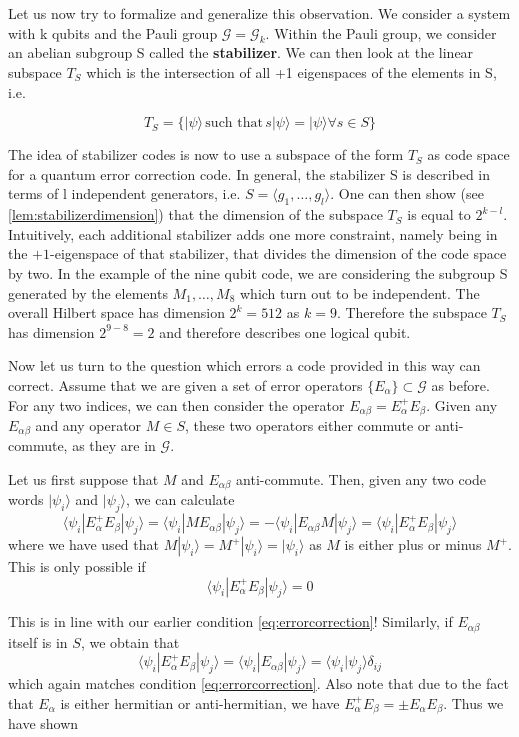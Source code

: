 \documentclass[a4paper, draft]{article}
\theoremstyle{own}
\theoremstyle{remark}
\begin{document}
Let us now try to formalize and generalize this observation. We consider a system with k qubits and the Pauli group $\mathcal G = \mathcal{G}_k$. Within the Pauli group, we consider an abelian subgroup S called the {\bf stabilizer}. We can then look at the linear subspace $T_S$ which is the intersection of all +1 eigenspaces of the elements in S, i.e.

$$
T_S = \{ |\psi \rangle \, \text{such that} \, s|\psi \rangle = |\psi \rangle 
\forall s \in S \}
$$

The idea of stabilizer codes is now to use a subspace of the form $T_S$ as code space for a quantum error correction code. In general, the stabilizer S is described in terms of l independent generators, i.e. $S = \langle g_1, \dots, g_l \rangle$. One can then show (see \ref{lem:stabilizerdimension}) that the dimension of the subspace $T_S$ is equal to $2^{k-l}$. Intuitively, each additional stabilizer adds one more constraint, namely being in the $+1$-eigenspace of that stabilizer, that divides the dimension of the code space by two. In the example of the nine qubit code, we are considering the subgroup S generated by the elements $M_1, \dots, M_8$ which turn out to be independent. The overall Hilbert space has dimension $2^k = 512$ as $k = 9$. Therefore the subspace $T_S$ has dimension $2^{9 - 8} = 2$ and therefore describes one logical qubit. 

Now let us turn to the question which errors a code provided in this way can correct. Assume that we are given a set of error operators $\{ E_\alpha \} \subset \mathcal{G}$ as before. For any two indices, we can then consider the operator $E_{\alpha \beta} = E_\alpha^+ E_\beta$. Given any $E_{\alpha \beta}$ and any operator $M \in S$, these two operators either commute or anti-commute, as they are in $\mathcal{G}$. 

Let us first suppose that $M$ and $E_{\alpha \beta}$ anti-commute. Then, given any two code words $|\psi_i \rangle$ and $|\psi_j \rangle$, we can calculate
$$
\langle \psi_i | E_\alpha^+ E_\beta | \psi_j \rangle =
\langle \psi_i | M E_{\alpha\beta} | \psi_j \rangle =
- \langle \psi_i | E_{\alpha\beta} M | \psi_j \rangle =
\langle \psi_i | E_\alpha^+ E_\beta | \psi_j \rangle
$$
where we have used that $M |\psi_i \rangle = M^+ |\psi_i \rangle = |\psi_i \rangle$ as $M$ is either plus or minus $M^+$. This is only possible if
$$
\langle \psi_i | E_\alpha^+ E_\beta | \psi_j \rangle = 0
$$

This is in line with our earlier condition \eqref{eq:errorcorrection}! Similarly, if $E_{\alpha \beta}$ itself is in $S$, we obtain that
$$
\langle \psi_i | E_\alpha^+ E_\beta | \psi_j \rangle =
\langle \psi_i | E_{\alpha\beta} | \psi_j \rangle =  \langle \psi_i |  \psi_j \rangle
\delta_{ij}
$$
which again matches condition \eqref{eq:errorcorrection}. Also note that due to the fact that $E_\alpha$ is either hermitian or anti-hermitian, we have $E_\alpha^+ E_\beta = \pm E_\alpha E_\beta$. Thus we have shown
\end{document}
